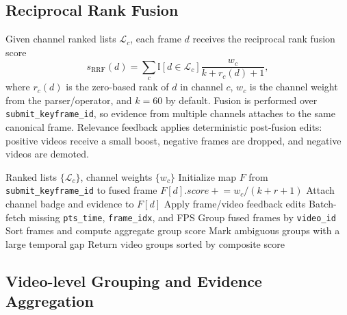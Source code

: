 \documentclass[conference]{IEEEtran}
\newcommand{\sid}{\texttt{submit\_keyframe\_id}}
\newcommand{\vid}{\texttt{video\_id}}
\newcommand{\fid}{\texttt{frame\_idx}}
\newcommand{\ptstime}{\texttt{pts\_time}}
\begin{document}
\subsection{Reciprocal Rank Fusion}

Given channel ranked lists $\mathcal{L}_c$, each frame $d$ receives the
reciprocal rank fusion score \cite{cormack2009rrf}
\[
  s_{\mathrm{RRF}}(d)=\sum_{c}
  \mathbb{I}[d \in \mathcal{L}_c]\frac{w_c}{k+r_c(d)+1},
\]
where $r_c(d)$ is the zero-based rank of $d$ in channel $c$, $w_c$ is the
channel weight from the parser/operator, and $k=60$ by default. Fusion is
performed over \sid{}, so evidence from multiple channels attaches to the same
canonical frame. Relevance feedback applies deterministic post-fusion edits:
positive videos receive a small boost, negative frames are dropped, and negative
videos are demoted.

\begin{algorithm}[!t]
\caption{Channel fusion and video grouping}
\label{alg:fusion}
\footnotesize
\begin{algorithmic}[1]
\Require Ranked lists $\{\mathcal{L}_c\}$, channel weights $\{w_c\}$
\State Initialize map $F$ from \sid{} to fused frame
    \State $F[d].score \mathrel{+}= w_c/(k+r+1)$
    \State Attach channel badge and evidence to $F[d]$
  \EndFor
\EndFor
\State Apply frame/video feedback edits
\State Batch-fetch missing \ptstime{}, \fid{}, and FPS
\State Group fused frames by \vid{}
  \State Sort frames and compute aggregate group score
  \State Mark ambiguous groups with a large temporal gap
\EndFor
\State Return video groups sorted by composite score
\end{algorithmic}
\end{algorithm}

\subsection{Video-level Grouping and Evidence Aggregation}
\end{document}
